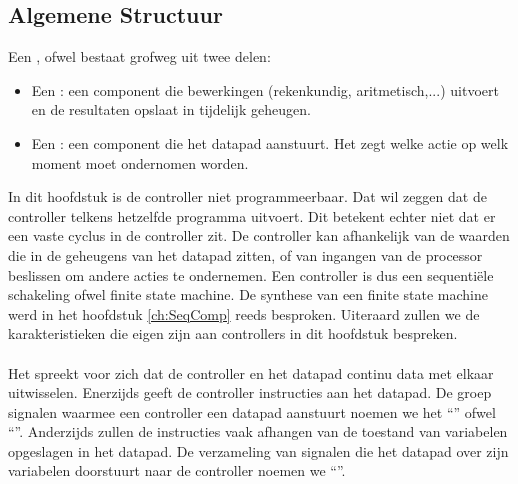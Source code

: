 \subsection{Algemene Structuur}
\label{ss:specialProcessorGeneralStructure}
Een , ofwel  bestaat grofweg uit twee delen:
\begin{itemize}
 \item Een : een component die bewerkingen (rekenkundig, aritmetisch,...) uitvoert en de resultaten opslaat in tijdelijk geheugen.
 \item Een : een component die het datapad aanstuurt. Het zegt welke actie op welk moment moet ondernomen worden.
\end{itemize}
In dit hoofdstuk is de controller niet programmeerbaar. Dat wil zeggen dat de controller telkens hetzelfde programma uitvoert. Dit betekent echter niet dat er een vaste cyclus in de controller zit. De controller kan afhankelijk van de waarden die in de geheugens van het datapad zitten, of van ingangen van de processor beslissen om andere acties te ondernemen. Een controller is dus een sequenti\"ele schakeling ofwel finite state machine. De synthese van een finite state machine werd in het hoofdstuk \ref{ch:SeqComp} reeds besproken. Uiteraard zullen we de karakteristieken die eigen zijn aan controllers in dit hoofdstuk bespreken.
\paragraph{}
Het spreekt voor zich dat de controller en het datapad continu data met elkaar uitwisselen. Enerzijds geeft de controller instructies aan het datapad. De groep signalen waarmee een controller een datapad aanstuurt noemen we het ``'' ofwel ``''. Anderzijds zullen de instructies vaak afhangen van de toestand van variabelen opgeslagen in het datapad. De verzameling van signalen die het datapad over zijn variabelen doorstuurt naar de controller noemen we ``''.
